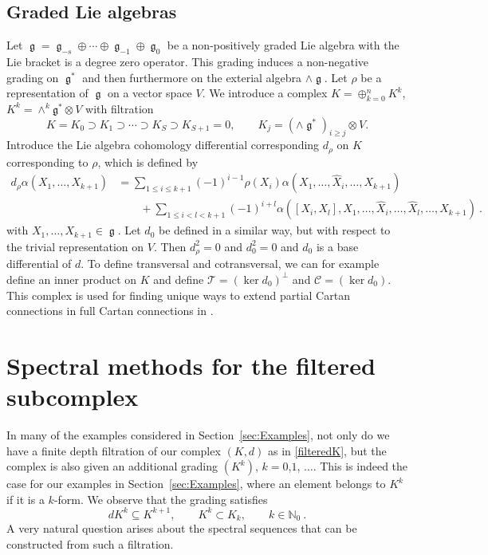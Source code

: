 \documentclass[10pt]{amsart}
\theoremstyle{remark}
\newcommand{\calT}{\mathcal{T}}
\newcommand{\calC}{\mathcal{C}}
\DeclareMathOperator{\frakg}{\mathfrak{g}}
\numberwithin{equation}{section}
\begin{document}
\subsection{Graded Lie algebras}\label{sec:GradedLie}
Let $\frakg = \frakg_{-s} \oplus \cdots \oplus \frakg_{-1} \oplus \frakg_{0}$ be a non-positively graded Lie algebra with the Lie bracket is a degree zero operator. This grading induces a non-negative grading on $\frakg^*$ and then furthermore on the exterial algebra $\wedge \frakg$. Let $\rho$ be a representation of $\frakg$ on a vector space $V$. We introduce a complex $K = \oplus_{k=0}^{n} K^k$, $K^k = \wedge^k \mathfrak{g}^* \otimes V$ with filtration
$$K = K_0 \supset K_1 \supset \cdots \supset K_S \supset K_{S+1} =0, \qquad K_j = ( \wedge \frakg^* )_{i \geq j} \otimes V.$$
Introduce the Lie algebra cohomology differential corresponding $d_\rho$ on $K$ corresponding to $\rho$, which is defined by
\begin{align*}
   d_\rho \alpha(X_1, \dots, X_{k+1}) & = \sum_{1\le i\le k+1} (-1)^{i-1} \rho(X_i) \alpha(X_1, \dots, \hat X_i, \dots, X_{k+1}) \\
    & \qquad + \sum_{1\le i<l<k+1} (-1)^{i+l} \alpha([X_i,X_l], X_1, \dots, \hat X_i, \dots, \hat X_l, \dots, X_{k+1})\ .
\end{align*}
with $X_1, \dots, X_{k+1} \in \frakg$. Let $d_0$ be defined in a similar way, but with respect to the trivial representation on $V$. Then $d^2_\rho =0$ and $d_0^2 =0$ and $d_0$ is a base differential of $d$. To define transversal and cotransversal, we can for example define an inner product on $K$ and define $\calT = (\ker d_0)^\perp$ and $\calC = (\ker d_0)$. This complex is used for finding unique ways to extend partial Cartan connections in full Cartan connections in \cite{GrSl25}. 



\section{Spectral methods for the filtered subcomplex} \label{sec:SpectralSeq}
In many of the examples considered in Section~\ref{sec:Examples}, not only do we have a finite depth filtration of our complex $(K,d)$ as in \eqref{filteredK}, but the complex is also given an additional grading $(K^k)$, $k=0$,$1$, $\dots$. 
This is indeed the case for our examples in Section~\ref{sec:Examples}, where an element belongs to $K^k$ if it is a $k$-form. We observe that the grading satisfies 
\begin{equation} \label{GradingCond}
dK^k \subseteq K^{k+1}, \qquad K^k \subset K_k, \qquad k \in \mathbb{N}_0\ .
\end{equation}
A very natural question arises about the spectral sequences that can be constructed from such a filtration. 
\end{document}
